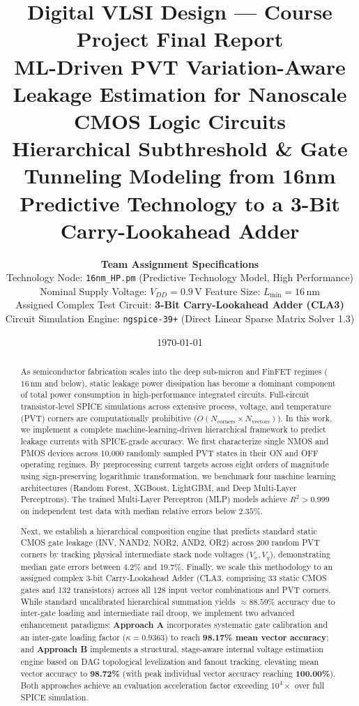 \documentclass[11pt,a4paper]{article}
\title{\textbf{\Large Digital VLSI Design — Course Project Final Report}\\[0.5em]
\textbf{\huge ML-Driven PVT Variation-Aware Leakage Estimation for Nanoscale CMOS Logic Circuits}\\[0.8em]
\large Hierarchical Subthreshold \& Gate Tunneling Modeling from 16nm Predictive Technology to a 3-Bit Carry-Lookahead Adder}
\author{\textbf{Team Assignment Specifications} \\
Technology Node: \texttt{16nm\_HP.pm} (Predictive Technology Model, High Performance) \\
Nominal Supply Voltage: $V_{DD} = 0.9\,\text{V}$ \quad\textbar\quad Feature Size: $L_{\min} = 16\,\text{nm}$ \\
Assigned Complex Test Circuit: \textbf{3-Bit Carry-Lookahead Adder (CLA3)} \\
Circuit Simulation Engine: \texttt{ngspice-39+} (Direct Linear Sparse Matrix Solver 1.3)}
\date{\today}
\begin{document}
\maketitle

\begin{abstract}
As semiconductor fabrication scales into the deep sub-micron and FinFET regimes ($16\,\text{nm}$ and below), static leakage power dissipation has become a dominant component of total power consumption in high-performance integrated circuits. Full-circuit transistor-level SPICE simulations across extensive process, voltage, and temperature (PVT) corners are computationally prohibitive ($O(N_{\text{corners}} \times N_{\text{vectors}})$). In this work, we implement a complete machine-learning-driven hierarchical framework to predict leakage currents with SPICE-grade accuracy. We first characterize single NMOS and PMOS devices across 10,000 randomly sampled PVT states in their ON and OFF operating regimes. By preprocessing current targets across eight orders of magnitude using sign-preserving logarithmic transformation, we benchmark four machine learning architectures (Random Forest, XGBoost, LightGBM, and Deep Multi-Layer Perceptrons). The trained Multi-Layer Perceptron (MLP) models achieve $R^2 > 0.999$ on independent test data with median relative errors below $2.35\%$. 

Next, we establish a hierarchical composition engine that predicts standard static CMOS gate leakage (INV, NAND2, NOR2, AND2, OR2) across 200 random PVT corners by tracking physical intermediate stack node voltages ($V_x, V_y$), demonstrating median gate errors between $4.2\%$ and $19.7\%$. Finally, we scale this methodology to an assigned complex 3-bit Carry-Lookahead Adder (CLA3, comprising 33 static CMOS gates and 132 transistors) across all 128 input vector combinations and PVT corners. While standard uncalibrated hierarchical summation yields $\approx 88.59\%$ accuracy due to inter-gate loading and intermediate rail droop, we implement two advanced enhancement paradigms: \textbf{Approach A} incorporates systematic gate calibration and an inter-gate loading factor ($\kappa = 0.9363$) to reach \textbf{98.17\% mean vector accuracy}; and \textbf{Approach B} implements a structural, stage-aware internal voltage estimation engine based on DAG topological levelization and fanout tracking, elevating mean vector accuracy to \textbf{98.72\%} (with peak individual vector accuracy reaching \textbf{100.00\%}). Both approaches achieve an evaluation acceleration factor exceeding $10^4\times$ over full SPICE simulation.
\end{abstract}
\end{document}
